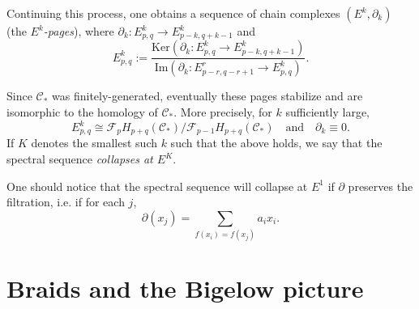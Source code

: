 \documentclass[11pt]{article}
\theoremstyle{plain} \newtheorem{thm}{Theorem}[subsection]
\theoremstyle{plain} \newtheorem{cor}[thm]{Corollary}
\theoremstyle{plain} \newtheorem{prop}[thm]{Proposition}
\theoremstyle{plain} \newtheorem{conj}[thm]{Conjecture}
\theoremstyle{plain} \newtheorem{lem}[thm]{Lemma}
\theoremstyle{definition} \newtheorem{df}[thm]{Definition}
\theoremstyle{remark} \newtheorem{rmk}[thm]{Remark}
\theoremstyle{remark} \newtheorem{obs}[thm]{Observation}
\newcommand{\Ccal}{\mathcal{C}}
\newcommand{\Fcal}{\mathcal{F}}
\newcommand{\del}{\partial}
\begin{document}
Continuing this process, one obtains a sequence of chain complexes $\left( E^k, \del_k \right)$ (the \textit{$E^k$-pages}), where $\del_k: E^k_{p,q} \rightarrow E^k_{p-k,q+k-1}$ and
$$ E^k_{p,q} := \frac{\text{Ker} \left( \del_k : E^k_{p,q} \rightarrow E^k_{p-k,q+k-1} \right)}{\text{Im} \left( \del_k:E^r_{p-r,q-r+1} \rightarrow E^k_{p,q} \right)}.$$

Since $\Ccal_*$ was finitely-generated, eventually these pages stabilize and are isomorphic to the homology of $\Ccal_*$.  More precisely, for $k$ sufficiently large,
$$ E^k_{p,q} \cong \Fcal_p H_{p+q} \left( \Ccal_* \right) / \Fcal_{p-1} H_{p+q} \left( \Ccal_* \right) \quad \text{and} \quad \del_k \equiv 0.$$
If $K$ denotes the smallest such $k$ such that the above holds, we say that the spectral sequence \textit{collapses at $E^K$}.

One should notice that the spectral sequence will collapse at $E^1$ if $\del$ preserves the filtration, i.e. if for each $j$,
$$ \del(x_j) = \sum_{f(x_i) = f(x_j)} a_i x_i.$$

%

\section{Braids and the Bigelow picture}
\end{document}
